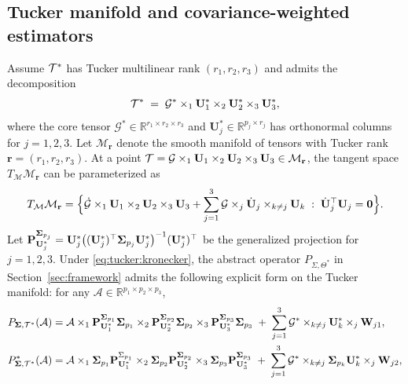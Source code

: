 \documentclass[authoryear,preprint,review,12pt]{elsarticle}
\begin{document}
	\subsection{Tucker manifold and covariance-weighted estimators}
	\label{subsec:tucker:manifold} 
	Assume $\mathcal{T}^\ast$ has Tucker multilinear rank $(r_1,r_2,r_3)$ and admits the decomposition
	\[
	\mathcal{T}^\ast \;=\; \mathcal{G}^\ast \times_1 \mathbf{U}_1^\ast \times_2 \mathbf{U}_2^\ast \times_3 \mathbf{U}_3^\ast,
	\]
	where the core tensor $\mathcal{G}^\ast \in \mathbb{R}^{r_1\times r_2\times r_3}$ and
	$\mathbf{U}_j^\ast\in \mathbb{R}^{p_j\times r_j}$ has orthonormal columns for $j=1,2,3$.
	Let $\mathcal{M}_{\mathbf{r}}$ denote the smooth manifold of tensors with Tucker rank $\mathbf{r}=(r_1,r_2,r_3)$.
	At a point $\mathcal{T}=\mathcal{G}\times_1 \mathbf{U}_1\times_2 \mathbf{U}_2\times_3 \mathbf{U}_3 \in \mathcal{M}_{\mathbf{r}}$,
	the tangent space $T_{\mathcal{M}}\mathcal{M}_{\mathbf{r}}$ can be parameterized as
	\begin{equation}
		T_{\mathcal{M}}\mathcal{M}_{\mathbf{r}}
		=
		\Bigl\{
		\dot{\mathcal{G}}\times_1 \mathbf{U}_1\times_2 \mathbf{U}_2\times_3 \mathbf{U}_3
		+
		\sum_{j=1}^3
		\mathcal{G}\times_j \dot{\mathbf{U}}_j \times_{k\neq j}\mathbf{U}_k
		\;:\;
		\dot{\mathbf{U}}_j^\top \mathbf{U}_j=\mathbf{0}
		\Bigr\}.
		\label{eq:tucker:tangent}
	\end{equation} 
	Let $\mathbf{P}_{\mathbf{U}_j^\ast}^{\mathbf{ \Sigma}_{p_j}}
	=
	\mathbf{U}_j^\ast \bigl((\mathbf{U}_j^\ast)^\top \mathbf{ \Sigma}_{p_j}\mathbf{U}_j^\ast\bigr)^{-1}(\mathbf{U}_j^\ast)^\top$
	be the generalized projection for $j=1,2,3$. 
	Under \eqref{eq:tucker:kronecker}, the abstract operator $P_{\Sigma,\Theta^\ast}$ in Section~\ref{sec:framework}
	admits the following explicit form on the Tucker manifold:
	for any $\mathcal{A}\in\mathbb{R}^{p_1\times p_2\times p_3}$,
	\begin{align}
		P_{\mathbf{ \Sigma},\mathcal{T}^\ast}(\mathcal{A})
		&=
		\mathcal{A}\times_1 \mathbf{P}_{\mathbf{U}_1^\ast}^{\mathbf{ \Sigma}_{p_1}}\mathbf{ \Sigma}_{p_1}
		\times_2 \mathbf{P}_{\mathbf{U}_2^\ast}^{\mathbf{ \Sigma}_{p_2}}\mathbf{ \Sigma}_{p_2}
		\times_3 \mathbf{P}_{\mathbf{U}_3^\ast}^{\mathbf{ \Sigma}_{p_3}}\mathbf{ \Sigma}_{p_3}
		\;+\;
		\sum_{j=1}^3 \mathcal{G}^\ast \times_{k\neq j}\mathbf{U}_k^\ast \times_j \mathbf{W}_{j1},
		\label{eq:tucker:P}
		\\
		P_{\mathbf{ \Sigma},\mathcal{T}^\ast}^{\ast}(\mathcal{A})
		&=
		\mathcal{A}\times_1 \mathbf{ \Sigma}_{p_1}\mathbf{P}_{\mathbf{U}_1^\ast}^{\Sigma_{p_1}}
		\times_2 \mathbf{ \Sigma}_{p_2}\mathbf{P}_{\mathbf{U}_2^\ast}^{\mathbf{ \Sigma}_{p_2}}
		\times_3 \mathbf{ \Sigma}_{p_3}\mathbf{P}_{\mathbf{U}_3^\ast}^{\mathbf{ \Sigma}_{p_3}}
		\;+\;
		\sum_{j=1}^3 \mathcal{G}^\ast \times_{k\neq j}\mathbf{ \Sigma}_{p_k}\mathbf{U}_k^\ast \times_j \mathbf{W}_{j2},
		\label{eq:tucker:Padj}
	\end{align}
\end{document}
